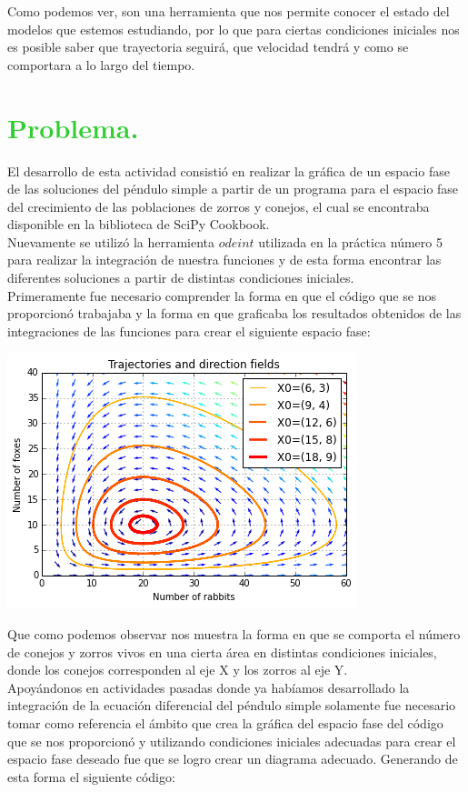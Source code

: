 \documentclass[12pt]{article}
\begin{document}
Como podemos ver, son una herramienta que nos permite conocer el estado del modelos que estemos estudiando, por lo que para ciertas condiciones iniciales nos es posible saber que trayectoria seguirá, que velocidad tendrá y como se comportara a lo largo del tiempo.


\pagebreak
\section*{\textcolor{LimeGreen}{Problema.}}
El desarrollo de esta actividad consistió en realizar la gráfica de un espacio fase de las soluciones del péndulo simple a partir de un programa para el espacio fase del crecimiento de las poblaciones de zorros y conejos, el cual se encontraba disponible en la biblioteca de SciPy Cookbook\cite{5}.\\

Nuevamente se utilizó la herramienta $odeint$ utilizada en la práctica número 5 para realizar la integración de nuestra funciones y de esta forma encontrar las diferentes soluciones a partir de distintas condiciones iniciales.\\

Primeramente fue necesario comprender la forma en que el código que se nos proporcionó trabajaba y la forma en que graficaba los resultados obtenidos de las integraciones de las funciones  para crear el siguiente espacio fase:

\includegraphics{espacioconejos.png}

Que como podemos observar nos muestra la forma en que se comporta el número de conejos y zorros vivos en una cierta área en distintas condiciones iniciales, donde los conejos corresponden al eje X y los zorros al eje Y.\\

Apoyándonos en actividades pasadas donde ya habíamos desarrollado la integración de la ecuación diferencial del péndulo simple solamente fue necesario tomar como referencia el ámbito que crea la gráfica del espacio fase del código que se nos proporcionó y utilizando condiciones iniciales adecuadas para crear el espacio fase deseado fue que se logro crear un diagrama adecuado. Generando de esta forma el siguiente código:\\
\end{document}

